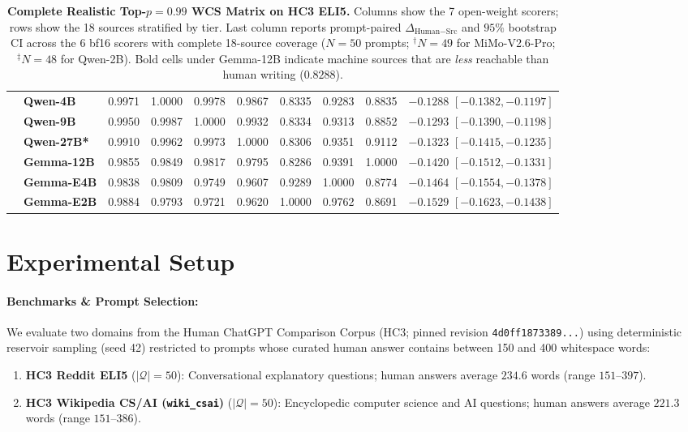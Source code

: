 \documentclass[11pt,a4paper,twocolumn]{article}
\begin{document}
\begin{table}[t]
\begin{tabular}{llcccccccc}
 & \textbf{Qwen-4B} & 0.9971 & 1.0000 & 0.9978 & 0.9867 & 0.8335 & 0.9283 & 0.8835 & $-0.1288$ $[-0.1382, -0.1197]$ \\
 & \textbf{Qwen-9B} & 0.9950 & 0.9987 & 1.0000 & 0.9932 & 0.8334 & 0.9313 & 0.8852 & $-0.1293$ $[-0.1390, -0.1198]$ \\
 & \textbf{Qwen-27B*} & 0.9910 & 0.9962 & 0.9973 & 1.0000 & 0.8306 & 0.9351 & 0.9112 & $-0.1323$ $[-0.1415, -0.1235]$ \\
 & \textbf{Gemma-12B} & 0.9855 & 0.9849 & 0.9817 & 0.9795 & 0.8286 & 0.9391 & 1.0000 & $-0.1420$ $[-0.1512, -0.1331]$ \\
 & \textbf{Gemma-E4B} & 0.9838 & 0.9809 & 0.9749 & 0.9607 & 0.9289 & 1.0000 & 0.8774 & $-0.1464$ $[-0.1554, -0.1378]$ \\
 & \textbf{Gemma-E2B} & 0.9884 & 0.9793 & 0.9721 & 0.9620 & 1.0000 & 0.9762 & 0.8691 & $-0.1529$ $[-0.1623, -0.1438]$ \\
\bottomrule
\end{tabular}
\caption{\textbf{Complete Realistic Top-$p=0.99$ WCS Matrix on HC3 ELI5.} Columns show the 7 open-weight scorers; rows show the 18 sources stratified by tier. Last column reports prompt-paired $\Delta_{\text{Human}-\text{Src}}$ and $95\%$ bootstrap CI across the 6 bf16 scorers with complete 18-source coverage ($N=50$ prompts; $^{\dagger}N=49$ for MiMo-V2.6-Pro; $^{\ddagger}N=48$ for Qwen-2B). Bold cells under Gemma-12B indicate machine sources that are \emph{less} reachable than human writing ($0.8288$).}
\label{tab:matrix_099}
\end{table}

\section{Experimental Setup}

\paragraph{Benchmarks \& Prompt Selection:}
We evaluate two domains from the Human ChatGPT Comparison Corpus (HC3; pinned revision \texttt{4d0ff1873389...}) \cite{guo2023hc3} using deterministic reservoir sampling (seed 42) restricted to prompts whose curated human answer contains between 150 and 400 whitespace words:
\begin{enumerate}
    \item \textbf{HC3 Reddit ELI5} ($|\mathcal{Q}|=50$): Conversational explanatory questions; human answers average $234.6$ words (range $151$--$397$).
    \item \textbf{HC3 Wikipedia CS/AI (\texttt{wiki\_csai})} ($|\mathcal{Q}|=50$): Encyclopedic computer science and AI questions; human answers average $221.3$ words (range $151$--$386$).
\end{enumerate}
\end{document}
